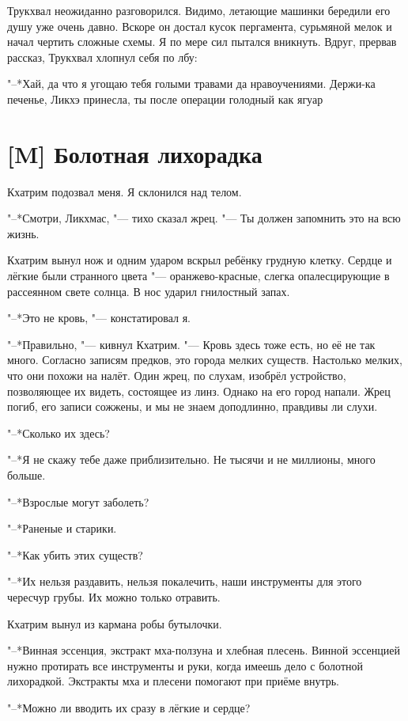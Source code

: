 Трукхвал неожиданно разговорился.
Видимо, летающие машинки бередили его душу уже очень давно.
Вскоре он достал кусок пергамента, сурьмяной мелок и начал чертить сложные схемы.
Я по мере сил пытался вникнуть.
Вдруг, прервав рассказ, Трукхвал хлопнул себя по лбу:

"--*Хай, да что я угощаю тебя голыми травами да нравоучениями.
Держи-ка печенье, Ликхэ принесла, ты после операции голодный как ягуар\ldotst

\section{[M] Болотная лихорадка}

Кхатрим подозвал меня.
Я склонился над телом.

"--*Смотри, Ликхмас, "--- тихо сказал жрец.
"--- Ты должен запомнить это на всю жизнь.

Кхатрим вынул нож и одним ударом вскрыл ребёнку грудную клетку.
Сердце и лёгкие были странного цвета "--- оранжево-красные, слегка опалесцирующие в рассеянном свете солнца.
В нос ударил гнилостный запах.

"--*Это не кровь, "--- констатировал я.

"--*Правильно, "--- кивнул Кхатрим.
"--- Кровь здесь тоже есть, но её не так много.
Согласно записям предков, это города мелких существ.
Настолько мелких, что они похожи на налёт.
Один жрец, по слухам, изобрёл устройство, позволяющее их видеть, состоящее из линз.
Однако на его город напали.
Жрец погиб, его записи сожжены, и мы не знаем доподлинно, правдивы ли слухи.

"--*Сколько их здесь?

"--*Я не скажу тебе даже приблизительно.
Не тысячи и не миллионы, много больше.

"--*Взрослые могут заболеть?

"--*Раненые и старики.

"--*Как убить этих существ?

"--*Их нельзя раздавить, нельзя покалечить, наши инструменты для этого чересчур грубы.
Их можно только отравить.

Кхатрим вынул из кармана робы бутылочки.

"--*Винная эссенция, экстракт мха-ползуна и хлебная плесень.
Винной эссенцией нужно протирать все инструменты и руки, когда имеешь дело с болотной лихорадкой.
Экстракты мха и плесени помогают при приёме внутрь.

"--*Можно ли вводить их сразу в лёгкие и сердце?


